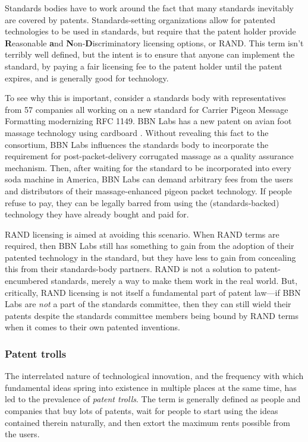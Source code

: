 \documentclass[acmtocl]%
{boviktrans}
\begin{document}
Standards bodies have to work around the fact that many standards
inevitably are covered by patents. Standards-setting organizations
allow for patented technologies to be used in standards, but require
that the patent holder provide {\bf R}easonable {\bf a}nd {\bf
  N}on-{\bf D}iscriminatory licensing options, or RAND. This term
isn't terribly well defined, but the intent is to ensure that anyone
can implement the standard, by paying a fair licensing fee to the
patent holder until the patent expires, and is generally good for
technology.

To see why this is important, consider a standards body with
representatives from 57 companies all working on a new standard for
Carrier Pigeon Message Formatting modernizing RFC 1149. BBN Labs has a
new patent on avian foot massage technology using cardboard
\cite{ebert}. Without revealing this fact to the consortium, BBN Labs
influences the standards body to incorporate the requirement for
post-packet-delivery corrugated massage as a quality assurance
mechanism. Then, after waiting for the standard to be incorporated
into every soda machine in America, BBN Labs can demand arbitrary fees
from the users and distributors of their massage-enhanced pigeon
packet technology. If people refuse to pay, they can be legally barred
from using the (standards-backed) technology they have already bought
and paid for.

RAND licensing is aimed at avoiding this scenario. When
RAND terms are required, then BBN Labs still has something to gain
from the adoption of their patented technology in the standard, but
they have less to gain from concealing this from their standards-body
partners. RAND is not a solution to patent-encumbered standards,
merely a way to make them work in the real world. But, critically,
RAND licensing is not itself a fundamental part of patent law---if
BBN Labs are {\it not} a part of the standards committee, then they can
still wield their patents despite the standards committee members
being bound by RAND terms when it comes to their own patented
inventions. 

\subsubsection{Patent trolls}

The interrelated nature of technological innovation, and the frequency
with which fundamental ideas spring into existence in multiple places
at the same time, has led to the prevalence of {\it patent trolls}.
The term is generally defined as people and companies that buy lots of
patents, wait for people to start using the ideas contained therein
naturally, and then extort the maximum rents possible from the users.
\end{document}
